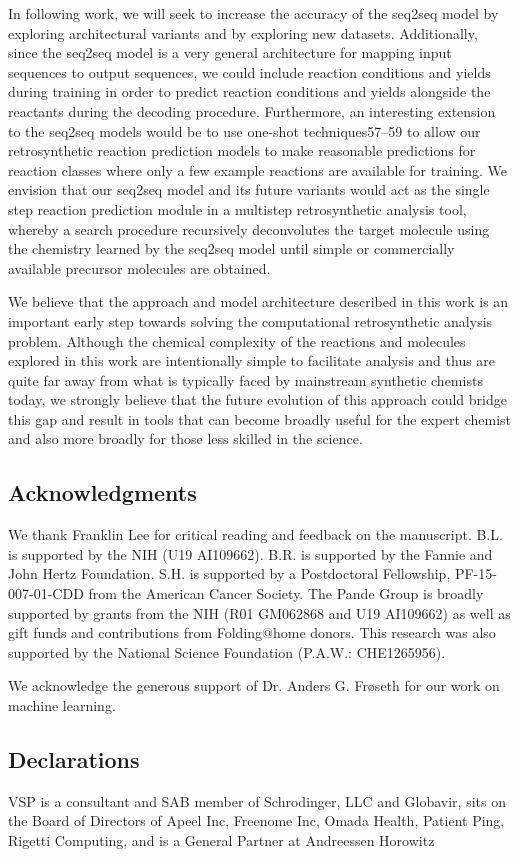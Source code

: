 In following work, we will seek to increase the accuracy of the seq2seq model by exploring architectural variants and by exploring new datasets. Additionally, since the seq2seq model is a very general architecture for mapping input sequences to output sequences, we could include reaction conditions and yields during training in order to predict reaction conditions and yields alongside the reactants during the decoding procedure. Furthermore, an interesting extension to the seq2seq models would be to use one-shot techniques57–59 to allow our retrosynthetic reaction prediction models to make reasonable predictions for reaction classes where only a few example reactions are available for training. We envision that our seq2seq model and its future variants would act as the single step reaction prediction module in a multistep retrosynthetic analysis tool, whereby a search procedure recursively deconvolutes the target molecule using the chemistry learned by the seq2seq model until simple or commercially available precursor molecules are obtained.

We believe that the approach and model architecture described in this work is an important early step towards solving the computational retrosynthetic analysis problem. Although the chemical complexity of the reactions and molecules explored in this work are intentionally simple to facilitate analysis and thus are quite far away from what is typically faced by mainstream synthetic chemists today, we strongly believe that the future evolution of this approach could bridge this gap and result in tools that can become broadly useful for the expert chemist and also more broadly for those less skilled in the science.

\subsection{Acknowledgments}

We thank Franklin Lee for critical reading and feedback on the manuscript. 
B.L. is supported by the NIH (U19 AI109662). B.R. is supported by the Fannie and John Hertz Foundation. S.H. is supported by a Postdoctoral Fellowship, PF-15-007-01-CDD from the American Cancer Society.
The Pande Group is broadly supported by grants from the NIH (R01 GM062868 and U19 AI109662) as well as gift funds and contributions from Folding@home donors. This research was also supported by the National Science Foundation (P.A.W.: CHE1265956).

We acknowledge the generous support of Dr. Anders G. Frøseth for our work on machine learning.

\subsection{Declarations}

VSP is a consultant and SAB member of Schrodinger, LLC and Globavir, sits on the Board of Directors of Apeel Inc, Freenome Inc, Omada Health, Patient Ping, Rigetti Computing, and is a General Partner at Andreessen Horowitz
